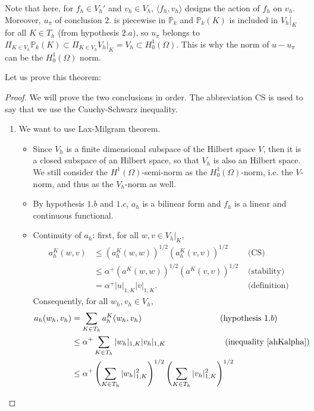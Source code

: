 \begin{remark}
Note that here, for $f_h\in V_h'$ and $v_h \in V_h$, $\langle f_h,v_h\rangle$ designs the action of $f_h$ on $v_h$. Moreover, $u_\pi$ of conclusion $2.$ is piecewise in $\mathbb{P}_k$ and $\mathbb{P}_k(K)$ is included in $V_h|_K$ for all $K\in T_h$ (from hypothesis $2.a$), so $u_\pi$ belongs to $\Pi_{K\in V_h} \mathbb{P}_k(K) \subset \Pi_{K\in V_h} V_h|_K = V_h \subset H_0^1(\Omega)$. This is why the norm of $u-u_\pi$ can be the $H_0^1(\Omega)$ norm. 
\end{remark}

\noindent Let us prove this theorem:
\begin{proof}
We will prove the two conclusions in order. The abbreviation CS is used to say that we use the Cauchy-Schwarz inequality.
\begin{enumerate}
\item We want to use Lax-Milgram theorem. 
\begin{itemize}
\item Since $V_h$ is a finite dimensional subspace of the Hilbert space $V$, then it is a closed subspace of an Hilbert space, so that $V_h$ is also an Hilbert space. We still consider the $H^1(\Omega)$-semi-norm as the $H_0^1(\Omega)$-norm, i.e. the $V$-norm, and thus as the $V_h$-norm as well.
\item By hypothesis $1.b$ and $1.c$, $a_h$ is a bilinear form and $f_h$ is a linear and continuous functional.
\item Continuity of $a_h$: first, for all $w,v\in V_h|_K$, 
\begin{align}
a_h^K(w,v) &\leq \left( a_h^K\left( w,w \right)\right)^{1/2}\left( a_h^K\left (v,v \right)\right)^{1/2} &\text{ (CS)} \nonumber \\
&\leq \alpha^+\left( a^K\left( w,w \right)\right)^{1/2}\left( a^K\left (v,v \right)\right)^{1/2} &\text{ (stability)} \nonumber \\
&= \alpha^+|u|_{1,K}|v|_{1,K}. &\text{ (definition)} \label{ahKalpha}
\end{align}
Consequently, for all $w_h, v_h \in V_h$, 
\begin{align*}
a_h(w_h,v_h) &= \sum_{K\in T_h} a_h^K(w_h,v_h) \hspace{3.2cm} \text{ (hypothesis }1.b)\\
&\leq \alpha^+\sum_{K\in T_h} |w_h|_{1,K}|v_h|_{1,K} \hspace{2.4cm}\text{ (inequality \ref{ahKalpha})}\\
&\leq \alpha^+\left( \sum_{K\in T_h}|w_h|_{1,K}^2 \right)^{1/2}\left( \sum_{K\in T_h}|v_h|_{1,K}^2 \right)^{1/2} \\

\end{align*}
\end{itemize}
\end{enumerate}
\end{proof}
